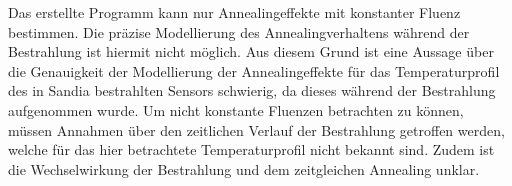 Das erstellte Programm kann nur Annealingeffekte mit konstanter Fluenz bestimmen.
Die präzise Modellierung des Annealingverhaltens während der Bestrahlung ist
hiermit nicht möglich. Aus diesem Grund ist eine Aussage über die Genauigkeit der
Modellierung der Annealingeffekte für das Temperaturprofil des in Sandia bestrahlten Sensors schwierig, da
dieses während der Bestrahlung aufgenommen wurde. Um nicht konstante Fluenzen
betrachten zu können, müssen Annahmen über den zeitlichen Verlauf der Bestrahlung getroffen
werden, welche für das hier betrachtete Temperaturprofil nicht bekannt sind.
Zudem ist die Wechselwirkung der Bestrahlung und dem zeitgleichen Annealing unklar.


